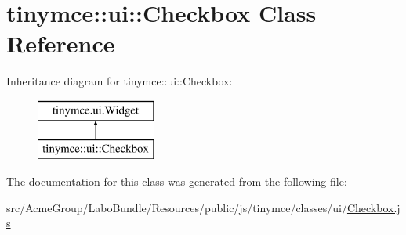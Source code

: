 \hypertarget{classtinymce_1_1ui_1_1_checkbox}{\section{tinymce\+:\+:ui\+:\+:Checkbox Class Reference}
\label{classtinymce_1_1ui_1_1_checkbox}
}
Inheritance diagram for tinymce\+:\+:ui\+:\+:Checkbox\+:\begin{figure}[H]
\begin{center}
\leavevmode
\includegraphics[height=2.000000cm]{classtinymce_1_1ui_1_1_checkbox}
\end{center}
\end{figure}


The documentation for this class was generated from the following file\+:\begin{DoxyCompactItemize}
\item 
src/\+Acme\+Group/\+Labo\+Bundle/\+Resources/public/js/tinymce/classes/ui/\hyperlink{_checkbox_8js}{Checkbox.\+js}\end{DoxyCompactItemize}
